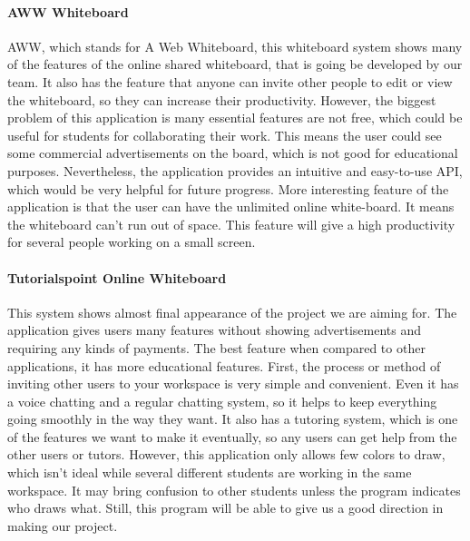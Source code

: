 \documentclass[10pt]{article}
\begin{document}
            \paragraph{AWW Whiteboard}
                AWW, which stands for A Web Whiteboard, this whiteboard system shows many of the features of the online shared whiteboard, that is going be developed by our team. It also has the feature that anyone can invite other people to edit or view the whiteboard, so they can increase their productivity. However, the biggest problem of this application is many essential features are not free, which could be useful for students for collaborating their work. This means the user could see some commercial advertisements on the board, which is not good for educational purposes. Nevertheless, the application provides an intuitive and easy-to-use API, which would be very helpful for future progress. More interesting feature of the application is that the user can have the unlimited online white-board. It means the whiteboard can’t run out of space. This feature will give a high productivity for several people working on a small screen. \cite{AWW}

            \paragraph{Tutorialspoint Online Whiteboard}
                 This system shows almost final appearance of the project we are aiming for. The application gives users many features without showing advertisements and requiring any kinds of payments. The best feature when compared to other applications, it has more educational features. First, the process or method of inviting other users to your workspace is very simple and convenient. Even it has a voice chatting and a regular chatting system, so it helps to keep everything going smoothly in the way they want. It also has a tutoring system, which is one of the features we want to make it eventually, so any users can get help from the other users or tutors. However, this application only allows few colors to draw, which isn’t ideal while several different students are working in the same workspace. It may bring confusion to other students unless the program indicates who draws what. Still, this program will be able to give us a good direction in making our project. \cite{TW}
\end{document}
